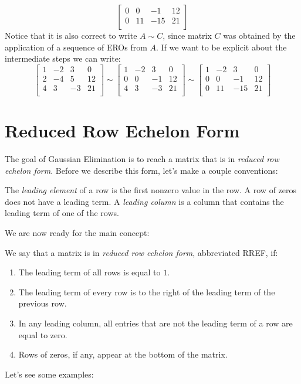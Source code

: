 \documentclass[12pt]{article}
\begin{document}
\begin{example}
\[\begin{bmatrix}
0 &  0 & -1  & 12\\
0 & 11 & -15 & 21\\ 
\end{bmatrix}
\]
Notice that it is also correct to write $A\sim C$, since matrix $C$ was obtained by the application of a sequence of EROs from $A$. If we want to be explicit about the intermediate steps we can write:
\[
\begin{bmatrix}
1 & -2 &  3 &  0\\
2 & -4 &  5 & 12\\
4 &  3 & -3 & 21\\
\end{bmatrix}
\sim
\begin{bmatrix}
1 & -2 &  3 &  0\\
0 &  0 & -1 & 12\\
4 &  3 & -3 & 21\\
\end{bmatrix}
\sim
\begin{bmatrix}
1 & -2 &  3  &  0\\
0 &  0 & -1  & 12\\
0 & 11 & -15 & 21\\ 
\end{bmatrix}
\]
\end{example}

\section{Reduced Row Echelon Form}

The goal of Gaussian Elimination is to reach a matrix that is in \emph{reduced row echelon form}. Before we describe this form, let's make a couple conventions:

\begin{definition} The \emph{leading element} of a row is the first nonzero value in the row. A row of zeros does not have a leading term. A \emph{leading column} is a column that contains the leading term of one of the rows.
\end{definition}
We are now ready for the main concept:

\begin{definition} We say that a matrix is in \emph{reduced row echelon form}, abbreviated RREF, if:
\begin{enumerate}
\item The leading term of all rows is equal to $1$.
\item The leading term of every row is to the right of the leading term of the previous row.
\item In any leading column, all entries that are not the leading term of a row are equal to zero.
\item Rows of zeros, if any, appear at the bottom of the matrix.
\end{enumerate}
\end{definition}
Let's see some examples:
\end{document}
